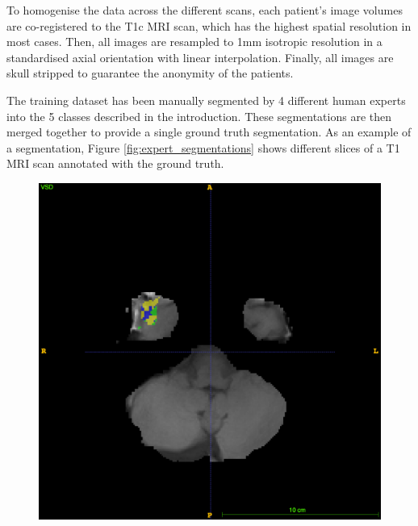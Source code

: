 \documentclass[12pt,a4paper,twoside,openright]{report}
\begin{document}
To homogenise the data across the different scans, each patient's image volumes are co-registered to the T1c MRI scan, which has the highest spatial resolution in most cases. Then, all images are resampled to 1mm isotropic resolution in a standardised axial orientation with linear interpolation. Finally, all images are skull stripped to guarantee the anonymity of the patients.

The training dataset has been manually segmented by 4 different human experts into the 5 classes described in the introduction. These segmentations are then merged together to provide a single ground truth segmentation. As an example of a segmentation, Figure \ref{fig:expert_segmentations} shows different slices of a T1 MRI scan annotated with the ground truth.

\begin{figure}
	\centering
	\includegraphics[scale=0.1]{expert_segmentation_49}

\end{figure}
\end{document}
